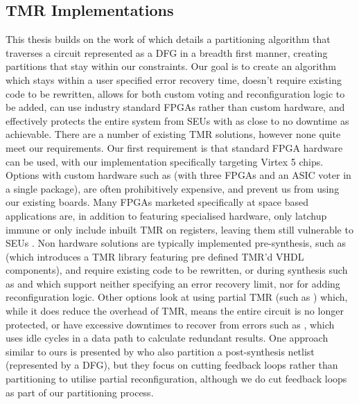 \documentclass[12pt,final,oneside]{memoir} %
\begin{document}
\subsection{\acl{TMR} Implementations}
This thesis builds on the work of\cite{DiesselChange} which details a partitioning algorithm that traverses a circuit represented as a \ac{DFG} in a breadth first manner, creating partitions that stay within our constraints.
Our goal is to create an algorithm which stays within a user specified error recovery time, doesn't require existing code to be rewritten, allows for both custom voting and reconfiguration logic to be added, can use industry standard \acp{FPGA} rather than custom hardware, and effectively protects the entire system from \acp{SEU} with as close to no downtime as achievable. There are a number of existing \ac{TMR} solutions, however none quite meet our requirements.
Our first requirement is that standard \ac{FPGA} hardware can be used, with our implementation specifically targeting Virtex 5 chips. Options with custom hardware such as \cite{VFPGATMR} (with three \acp{FPGA} and an \ac{ASIC} voter in a single package), are often prohibitively expensive, and prevent us from using our existing boards.
Many \acp{FPGA} marketed specifically at space based applications are, in addition to featuring specialised hardware, only latchup immune or only include inbuilt \ac{TMR} on registers, leaving them still vulnerable to \acp{SEU} \cite{FPGAReview}.
Non hardware solutions are typically implemented pre-synthesis, such as \cite{ftmr} (which introduces a \ac{TMR} library featuring pre defined \ac{TMR}'d \ac{VHDL} components), and require existing code to be rewritten, or during synthesis such as \cite{synplify} and \cite{tmrtool} which support neither specifying an error recovery limit, nor for adding reconfiguration logic.
Other options look at using partial \ac{TMR} (such as \cite{partialTMR}) which, while it does reduce the overhead of \ac{TMR}, means the entire circuit is no longer protected, or have excessive downtimes to recover from errors such as \cite{VTMR}, which uses idle cycles in a data path to calculate redundant results.
One approach similar to ours is presented by \cite{PostSynth} who also partition a post-synthesis netlist (represented by a \ac{DFG}), but they focus on cutting feedback loops rather than partitioning to utilise partial reconfiguration, although we do cut feedback loops as part of our partitioning process.
\end{document}
